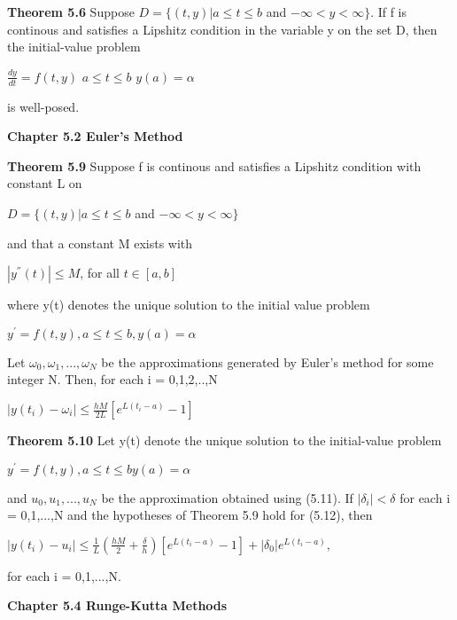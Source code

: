 \documentclass{article}
\begin{document}
\textbf {Theorem 5.6} Suppose $D = \{ (t,y) | a \leq t \leq b$ and $- \infty < y < \infty \}$. If f is continous and satisfies a Lipshitz condition in the variable y on the set D, then the initial-value problem
\begin{center}
$\frac{dy}{dt} = f(t,y)$     $a \leq t \leq b$    $y(a) = \alpha$
\end{center}
is well-posed.

\textbf {Chapter 5.2 Euler's Method}

\textbf {Theorem 5.9} Suppose f is continous and satisfies a Lipshitz condition with constant L on
\begin{center}
$D = \{ (t,y) | a \leq t \leq b$ and $- \infty < y < \infty\}$
\end{center}
and that a constant M exists with
\begin{center}
$|y^{''}(t)| \leq M$,    for all $t \in [a,b]$
\end{center}
where y(t) denotes the unique solution to the initial value problem
\begin{center}
$y^{'} = f(t,y),   a \leq t \leq b,    y(a) = \alpha$
\end{center}

Let $\omega_0, \omega_1 ,..., \omega_N$ be the approximations generated by Euler's method for some integer N. Then, for each i = 0,1,2,..,N
\begin{center}
$|y(t_i) - \omega_i | \leq \frac{hM}{2L} [e^{L(t_i - a)} - 1]$
\end{center}

\textbf {Theorem 5.10} Let y(t) denote the unique solution to the initial-value problem
\begin{center}
$y^{'} = f(t,y),  a \leq t \leq b   y(a) = \alpha$
\end{center}
and $u_0, u_1,...,u_N$ be the approximation obtained using (5.11). If $|\delta_i| < \delta$ for each i = 0,1,...,N and the hypotheses of Theorem 5.9 hold for (5.12), then
\begin{center}
$| y(t_i) - u_i| \leq \frac{1}{L} (\frac{hM}{2} +  \frac{\delta}{h}) [e^{L(t_i - a)} - 1] + |\delta_0| e^{L(t_i - a)},$
\end{center}
for each i = 0,1,...,N.

\textbf {Chapter 5.4 Runge-Kutta Methods}
\end{document}
